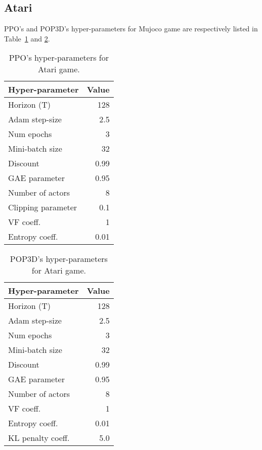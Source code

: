\documentclass{article}
\begin{document}
\subsection{Atari}\label{hyper-atari}
PPO's and  POP3D's hyper-parameters for Mujoco game are respectively listed in Table~\ref{PPO-Atari-game-hyperparameter} and \ref{POP3D-Atari-game-hyperparameter}.
\begin{table}[ht]
	\begin{center}
		\begin{tabular}{lr}
			\toprule
			Hyper-parameter & Value \\
			\midrule
			Horizon (T)    &128 \\
			Adam step-size &2.5 \\
			Num epochs    & 3 \\
			Mini-batch size    & 32\\
			Discount      & 0.99\\
			GAE parameter       & 0.95 \\
			Number of actors      & 8\\
			Clipping parameter   & 0.1 \\
			VF coeff. &1 \\
			Entropy coeff. &0.01 \\
			\bottomrule
		\end{tabular}
	\end{center}
	\caption{PPO's hyper-parameters for Atari game.}
	\label{PPO-Atari-game-hyperparameter}
\end{table}

\begin{table}[ht]
	\begin{center}
		\begin{tabular}{lr}
			\toprule
			Hyper-parameter & Value \\
			\midrule
			Horizon (T)    &128 \\
			Adam step-size &2.5 \\
			Num epochs    & 3 \\
			Mini-batch size    & 32\\
			Discount      & 0.99\\
			GAE parameter       & 0.95 \\
			Number of actors      & 8\\
			VF coeff. &1 \\
			Entropy coeff. &0.01 \\
			KL penalty coeff. &5.0 \\
			\bottomrule
		\end{tabular}
	\end{center}
	\caption{POP3D's hyper-parameters for Atari game.}
	\label{POP3D-Atari-game-hyperparameter}
\end{table}
\end{document}
